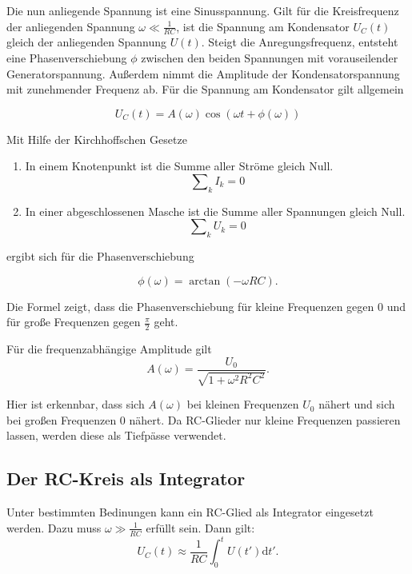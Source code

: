 Die nun anliegende Spannung ist eine Sinusspannung. Gilt für die Kreisfrequenz der anliegenden Spannung $\omega \ll \frac{1}{RC}$, ist die Spannung am Kondensator $U_C(t)$ gleich der anliegenden Spannung $U(t)$.
Steigt die Anregungsfrequenz, entsteht eine Phasenverschiebung $\phi$ zwischen den beiden Spannungen mit vorauseilender Generatorspannung. Außerdem nimmt die Amplitude der Kondensatorspannung mit zunehmender Frequenz ab. Für die Spannung am Kondensator gilt allgemein

\begin{equation}
  U_C(t) = A(\omega) \cos (\omega t + \phi(\omega))
\end{equation}

Mit Hilfe der Kirchhoffschen Gesetze
\begin{enumerate}
  \item In einem Knotenpunkt ist die Summe aller Ströme gleich Null.
  \begin{equation}
    \mathrm\sum_{k} I_k = 0
  \end{equation}
  \item In einer abgeschlossenen Masche ist die Summe aller Spannungen gleich Null.
  \begin{equation}
    \mathrm\sum_{k} U_k = 0
  \end{equation}
\end{enumerate}

ergibt sich für die Phasenverschiebung

\begin{equation}
  \label{eqn:phase}
  \phi(\omega) = \arctan(-\omega RC).
\end{equation}

Die Formel zeigt, dass die Phasenverschiebung für kleine Frequenzen gegen 0 und für große Frequenzen gegen $\frac{\pi}{2}$ geht.

Für die frequenzabhängige Amplitude gilt
\begin{equation}
  \label{eqn:amplitude}
  A(\omega) = \frac{U_0}{\sqrt{1 + \omega^2R^2C^2}}.
\end{equation}

Hier ist erkennbar, dass sich $A(\omega)$ bei kleinen Frequenzen $U_0$ nähert und sich bei großen Frequenzen 0 nähert. Da RC-Glieder nur kleine Frequenzen passieren lassen, werden diese als Tiefpässe verwendet.

\subsection{Der RC-Kreis als Integrator}
Unter bestimmten Bedinungen kann ein RC-Glied als Integrator eingesetzt werden. Dazu muss $\omega \gg \frac{1}{RC}$ erfüllt sein.
Dann gilt:
\begin{equation}
  U_C(t) \approx \frac{1}{RC} \int_0^t U(t') \mathrm{d}t'.
\end{equation}
